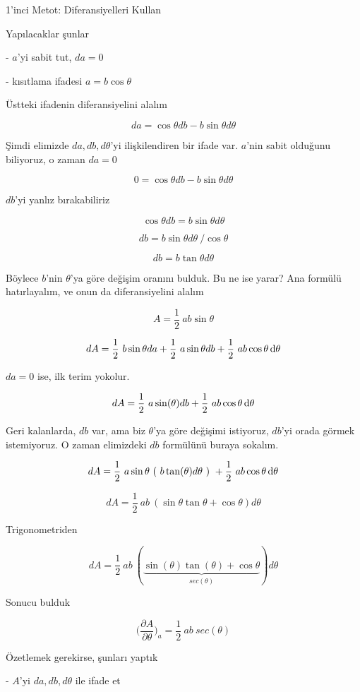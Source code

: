 \documentclass[12pt,fleqn]{article}\usepackage{../../common}
\begin{document}
1'inci Metot: Diferansiyelleri Kullan

Yapılacaklar şunlar

- $a$'yi sabit tut, $da = 0$

- kısıtlama ifadesi $a = b \cos\theta$

Üstteki ifadenin diferansiyelini alalım

$$ da = \cos \theta db - b \sin\theta d\theta $$

Şimdi elimizde $da,db,d\theta$'yi ilişkilendiren bir ifade var. $a$'nin
sabit olduğunu biliyoruz, o zaman $da=0$

$$ 0 = \cos \theta db - b \sin \theta d\theta $$

$db$'yi yanlız bırakabiliriz

$$ \cos\theta db = b \sin\theta d\theta $$

$$ db = b \sin\theta d\theta \ / \cos\theta $$

$$ db = b \tan\theta d\theta  $$

Böylece $b$'nin $\theta$'ya göre değişim oranını bulduk. Bu ne ise yarar?
Ana formülü hatırlayalım, ve onun da diferansiyelini alalım

$$ A = \frac{1}{2} \ ab \sin\theta $$

$$ dA = \frac{1}{2} \ b \sin\theta da + 
\frac{1}{2} \ a \sin\theta db + 
\frac{1}{2} \ ab \cos\theta \,\mathrm{d} \theta
 $$

$da = 0$ ise, ilk terim yokolur. 

$$ dA = 
\frac{1}{2} \ a \sin(\theta) db + 
\frac{1}{2} \ ab \cos \theta \,\mathrm{d} \theta
$$

Geri kalanlarda, $db$ var, ama biz $\theta$'ya göre değişimi istiyoruz,
$db$'yi orada görmek istemiyoruz. O zaman elimizdeki $db$ formülünü buraya
sokalım. 

$$ dA =  
\frac{1}{2} \ a \sin\theta \ ( \ b \tan(\theta) d\theta \ ) \ + 
\frac{1}{2} \ ab \cos\theta \,\mathrm{d} \theta
$$

$$ dA =  
\frac{1}{2} \ ab \ (\sin\theta \tan\theta +  \cos\theta )d\theta
$$

Trigonometriden 

$$ dA =  
\frac{1}{2} \ ab \ (
\underbrace{\sin(\theta) \tan(\theta) +  \cos \theta}_{sec(\theta)}
)d\theta
$$

Sonucu bulduk 

$$ \bigg( \frac{\partial A}{\partial \theta} \bigg)_{a} = 
\frac{1}{2} \ ab \ sec(\theta)
$$

Özetlemek gerekirse, şunları yaptık

- $A$'yi $da,db,d\theta$ ile ifade et
\end{document}

